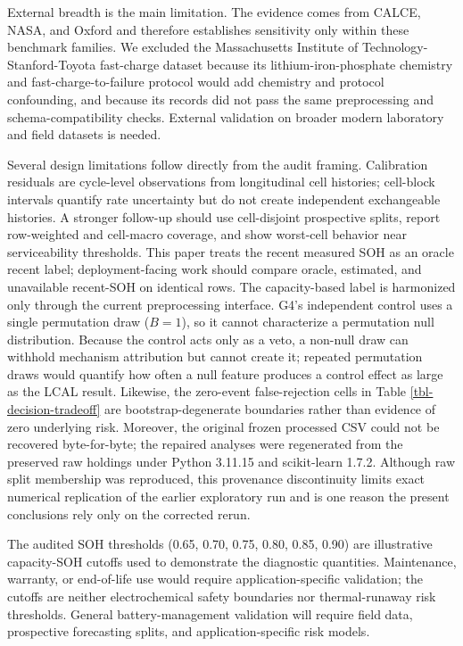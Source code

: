 \documentclass[
  number,
  preprint]{elsarticle}
\begin{document}
External breadth is the main limitation. The evidence comes from CALCE,
NASA, and Oxford and therefore establishes sensitivity only within these
benchmark families. We excluded the Massachusetts Institute of
Technology-Stanford-Toyota fast-charge dataset
\citep{severson2019datadriven} because its lithium-iron-phosphate
chemistry and fast-charge-to-failure protocol would add chemistry and
protocol confounding, and because its records did not pass the same
preprocessing and schema-compatibility checks. External validation on
broader modern laboratory and field datasets is needed.

Several design limitations follow directly from the audit framing.
Calibration residuals are cycle-level observations from longitudinal
cell histories; cell-block intervals quantify rate uncertainty but do
not create independent exchangeable histories. A stronger follow-up
should use cell-disjoint prospective splits, report row-weighted and
cell-macro coverage, and show worst-cell behavior near serviceability
thresholds. This paper treats the recent measured SOH as an oracle
recent label; deployment-facing work should compare oracle, estimated,
and unavailable recent-SOH on identical rows. The capacity-based label
is harmonized only through the current preprocessing interface. G4's
independent control uses a single permutation draw (\(B=1\)), so it
cannot characterize a permutation null distribution. Because the control
acts only as a veto, a non-null draw can withhold mechanism attribution
but cannot create it; repeated permutation draws would quantify how
often a null feature produces a control effect as large as the LCAL
result. Likewise, the zero-event false-rejection cells in Table
\ref{tbl-decision-tradeoff} are bootstrap-degenerate boundaries rather
than evidence of zero underlying risk. Moreover, the original frozen
processed CSV could not be recovered byte-for-byte; the repaired
analyses were regenerated from the preserved raw holdings under Python
3.11.15 and scikit-learn 1.7.2. Although raw split membership was
reproduced, this provenance discontinuity limits exact numerical
replication of the earlier exploratory run and is one reason the present
conclusions rely only on the corrected rerun.

The audited SOH thresholds (0.65, 0.70, 0.75, 0.80, 0.85, 0.90) are
illustrative capacity-SOH cutoffs used to demonstrate the diagnostic
quantities. Maintenance, warranty, or end-of-life use would require
application-specific validation; the cutoffs are neither electrochemical
safety boundaries nor thermal-runaway risk thresholds. General
battery-management validation will require field data, prospective
forecasting splits, and application-specific risk models.
\end{document}
